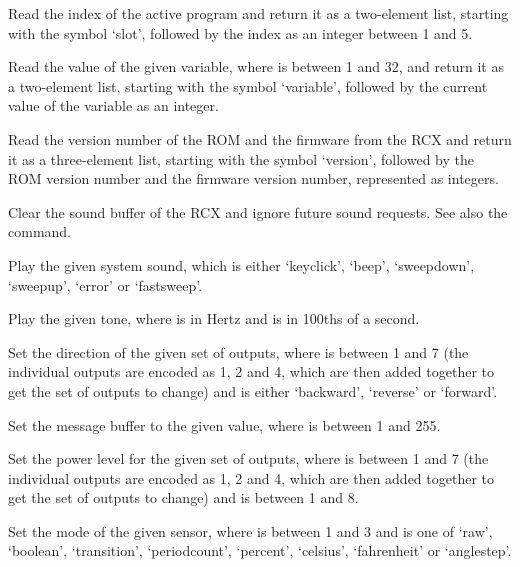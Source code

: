   Read the index of the active program and return it as a two-element list, starting with the symbol `slot', followed
  by the index as an integer between 1 and 5.
  
  Read the value of the given variable, where  is between 1 and 32, and return it as a two-element list,
  starting with the symbol `variable', followed by the current value of the variable as an integer.
  
  Read the version number of the ROM and the firmware from the RCX and return it as a three-element list, starting
  with the symbol `version', followed by the ROM version number and the firmware version number, represented as integers.
  
  Clear the sound buffer of the RCX and ignore future sound requests.
  See also the  command.
  
  Play the given system sound, which is either `keyclick', `beep', `sweepdown', `sweepup', `error' or `fastsweep'.
  
  Play the given tone, where  is in Hertz and  is in 100ths of a second.
  
  Set the direction of the given set of outputs, where  is between 1 and 7
  (the individual outputs are encoded as 1, 2 and 4, which are then added together to get the set of outputs to change) and
   is either `backward', `reverse' or `forward'.
  
  Set the message buffer to the given value, where  is between 1 and 255.
  
  Set the power level for the given set of outputs, where  is between 1 and 7
  (the individual outputs are encoded as 1, 2 and 4, which are then added together to get the set of outputs to change) and
   is between 1 and 8.
  
  Set the mode of the given sensor, where  is between 1 and 3 and  is one of `raw', `boolean',
  `transition', `periodcount', `percent', `celsius', `fahrenheit' or `anglestep'.
  
